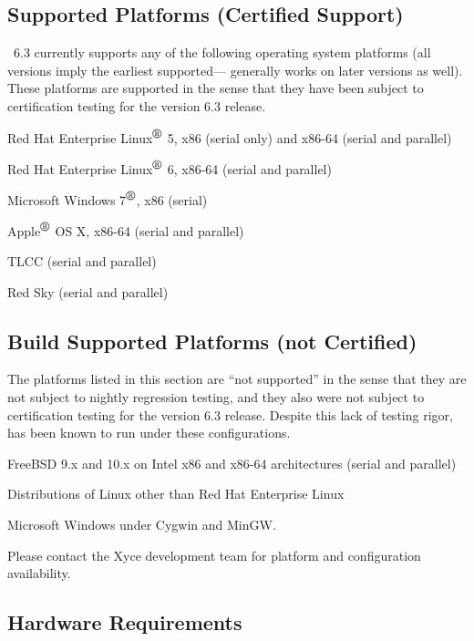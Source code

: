 \documentclass[11pt,report,strict]{SANDreport}
\begin{document}
\subsection{Supported Platforms (Certified Support)}
\Xyce\ 6.3 currently supports any of the following operating system platforms
(all versions imply the earliest supported---\Xyce{} generally works on later
versions as well).  These platforms are supported in the sense that they have
been subject to certification testing for the \Xyce{} version 6.3 release.  

\begin{XyceItemize}
\item Red Hat Enterprise Linux${}^{\mbox{\textregistered}}$ 5, x86 (serial only) and x86-64 (serial and parallel)
\item Red Hat Enterprise Linux${}^{\mbox{\textregistered}}$ 6, x86-64 (serial and parallel)
\item Microsoft Windows 7${}^{\mbox{\textregistered}}$, x86 (serial)
\item Apple${}^{\mbox{\textregistered}}$ OS X, x86-64 (serial and parallel)
\item TLCC (serial and parallel)
\item Red Sky (serial and parallel)
\end{XyceItemize}

\subsection{Build Supported Platforms (not Certified)}
The platforms listed in this section are ``not supported'' in the
sense that they are not subject to nightly regression testing, and
they also were not subject to certification testing for the \Xyce{}
version 6.3 release.  Despite this lack of testing rigor, \Xyce{} has
been known to run under these configurations.

\begin{XyceItemize}
\item FreeBSD 9.x and 10.x on Intel x86 and x86-64 architectures (serial and parallel)
\item Distributions of Linux other than Red Hat Enterprise Linux
\item Microsoft Windows under Cygwin and MinGW.
\end{XyceItemize}

Please contact the Xyce development team for platform and configuration availability.

\subsection{Hardware Requirements}
\end{document}
